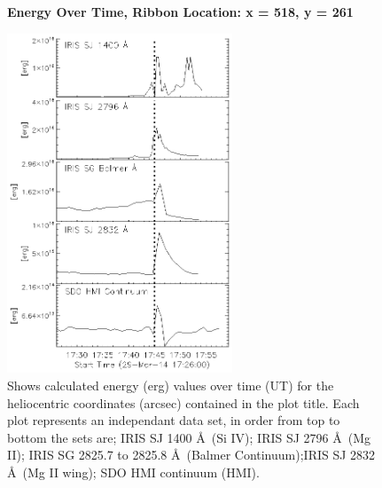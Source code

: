 \begin{figure}[H]
  \begin{center}
  \textbf{Energy Over Time, Ribbon Location: x = 518, y = 261 }\par\medskip
  \includegraphics[width=0.6\textwidth]{29-Mar-14-Ribbon-xyPosition-518-261-Frame-1-Energy-Ladder}
  \end{center}
  \caption{Shows calculated energy (erg) values over time (UT) for the heliocentric coordinates (arcsec) contained in the plot title. Each plot represents an independant data set, in order from top to bottom the sets are; IRIS SJ 1400 \AA\ (Si IV); IRIS SJ 2796 \AA\ (Mg II); IRIS SG  2825.7 to 2825.8 \AA\ (Balmer Continuum);IRIS SJ 2832 \AA\ (Mg II wing); SDO HMI continuum (HMI).}\label{erb2}
\end{figure}


